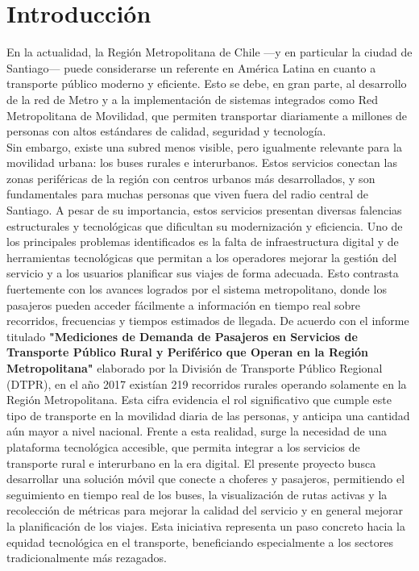 \documentclass[12pt]{article}
\begin{document}
\section{Introducción}
En la actualidad, la Región Metropolitana de Chile —y en particular la ciudad de Santiago— puede considerarse un referente en América Latina en cuanto a transporte público moderno y eficiente. Esto se debe, en gran parte, al desarrollo de la red de Metro y a la implementación de sistemas integrados como Red Metropolitana de Movilidad, que permiten transportar diariamente a millones de personas con altos estándares de calidad, seguridad y tecnología.
\\
Sin embargo, existe una subred menos visible, pero igualmente relevante para la movilidad urbana: los buses rurales e interurbanos. Estos servicios conectan las zonas periféricas de la región con centros urbanos más desarrollados, y son fundamentales para muchas personas que viven fuera del radio central de Santiago. A pesar de su importancia, estos servicios presentan diversas falencias estructurales y tecnológicas que dificultan su modernización y eficiencia.
Uno de los principales problemas identificados es la falta de infraestructura digital y de herramientas tecnológicas que permitan a los operadores mejorar la gestión del servicio y a los usuarios planificar sus viajes de forma adecuada. Esto contrasta fuertemente con los avances logrados por el sistema metropolitano, donde los pasajeros pueden acceder fácilmente a información en tiempo real sobre recorridos, frecuencias y tiempos estimados de llegada.
De acuerdo con el informe titulado \textbf{"Mediciones de Demanda de Pasajeros en Servicios de Transporte Público Rural y Periférico que Operan en la Región Metropolitana"} elaborado por la División de Transporte Público Regional (DTPR), en el año 2017 existían 219 recorridos rurales operando solamente en la Región Metropolitana. Esta cifra evidencia el rol significativo que cumple este tipo de transporte en la movilidad diaria de las personas, y anticipa una cantidad aún mayor a nivel nacional.
Frente a esta realidad, surge la necesidad de una plataforma tecnológica accesible, que permita integrar a los servicios de transporte rural e interurbano en la era digital. El presente proyecto busca desarrollar una solución móvil que conecte a choferes y pasajeros, permitiendo el seguimiento en tiempo real de los buses, la visualización de rutas activas y la recolección de métricas para mejorar la calidad del servicio y en general mejorar la planificación de los viajes. Esta iniciativa representa un paso concreto hacia la equidad tecnológica en el transporte, beneficiando especialmente a los sectores tradicionalmente más rezagados.
\newpage
\end{document}
